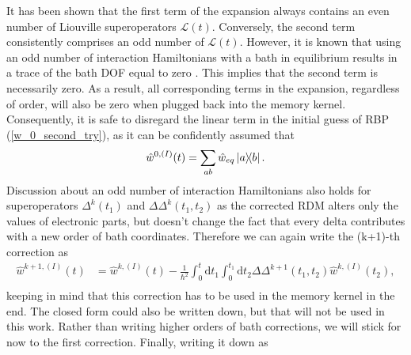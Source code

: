 It has been shown that the first term of the expansion always contains an even number of Liouville superoperators $\mathcal{L}(t)$. Conversely, the second term consistently comprises an odd number of $\mathcal{L}(t)$. However, it is known that using an odd number of interaction Hamiltonians with a bath in equilibrium results in a trace of the bath DOF equal to zero \cite{mukamel_principles_1995}. This implies that the second term is necessarily zero. As a result, all corresponding terms in the expansion, regardless of order, will also be zero when plugged back into the memory kernel. Consequently, it is safe to disregard the linear term in the initial guess of RBP (\ref{w_0_second_try}), as it can be confidently assumed that
\begin{equation}
\label{w_0_final_try}
    \hat{w}^{0, (I)}(t)  = \sum_{ab} \hat{w}_{eq} \ketbra{a}{b} .
\end{equation}
Discussion about an odd number of interaction Hamiltonians also holds for superoperators $\Delta^{k}(t_1)$ and $\Delta\Delta^{k}(t_1, t_2)$ as the corrected RDM alters only the values of electronic parts, but doesn't change the fact that every delta contributes with a new order of bath coordinates. Therefore we can again write the (k+1)-th correction as 
\begin{equation}
\label{ansatz_RBP_iterative_Delta_with_k_general}
    \begin{aligned}
    \hat{w}^{k+1,(I)}(t) &= \hat{w}^{k, (I)}(t) - \frac{1}{\hbar^2} \int_{0}^{t} \mathrm{d} t_1 \int_{0}^{t_1} \mathrm{d} t_2 \Delta\Delta^{k+1}(t_1, t_2) \hat{w}^{k, (I)}(t_2), \\
    \end{aligned}
\end{equation}
keeping in mind that this correction has to be used in the memory kernel in the end. The closed form could also be written down, but that will not be used in this work. Rather than writing higher orders of bath corrections, we will stick for now to the first correction. Finally, writing it down as 

